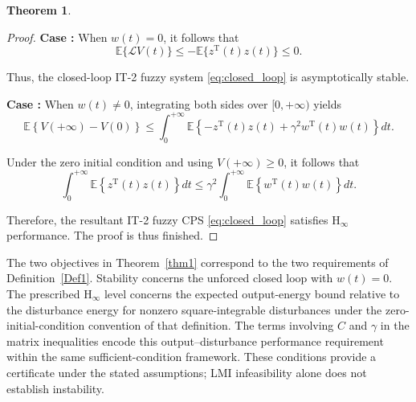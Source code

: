 \documentclass[preprint,review,fleqn,sort&compress,3p]{elsarticle}
\theoremstyle{definition} %
\theoremstyle{definition}%
\newtheorem{thm}{Theorem}[section]
\begin{document}
\begin{thm}
\begin{proof}
\textbf{Case \uppercase\expandafter{}:} When $w(t)=0$, it follows that
\begin{equation}
	\mathbb{E}\{\mathcal{L}V(t)\}
	\leq
	-\mathbb{E}\{z^{\mathrm{T}}(t)z(t)\}
	\leq 0.
\end{equation}

Thus, the closed-loop IT-2 fuzzy system \eqref{eq:closed_loop} is asymptotically stable.

\textbf{Case \uppercase\expandafter{}:} When $w(t)\neq0$, integrating both sides over $[0,+\infty)$ yields
\begin{equation}
	\mathbb{E}\left\{V(+\infty)-V(0)\right\}
	\leq
	\int_{0}^{+\infty}
	\mathbb{E}\left\{
	-z^{\mathrm{T}}(t)z(t)
	+\gamma^2 w^{\mathrm{T}}(t)w(t)
	\right\}dt.
\end{equation}

Under the zero initial condition and using $V(+\infty)\ge0$, it follows that
\begin{equation}
	\int_{0}^{+\infty}
	\mathbb{E}\left\{
	z^{\mathrm{T}}(t)z(t)
	\right\}dt
	\leq
	\gamma^2
	\int_{0}^{+\infty}
	\mathbb{E}\left\{
	w^{\mathrm{T}}(t)w(t)
	\right\}dt.
\end{equation}

Therefore, the resultant IT-2 fuzzy CPS \eqref{eq:closed_loop} satisfies $\mathrm{H}_\infty$ performance. The proof is thus finished.
\end{proof}
\end{thm}
The two objectives in Theorem~\ref{thm1} correspond to the two requirements of Definition~\ref{Def1}. Stability concerns the unforced closed loop with $w(t)=0$. The prescribed $\mathrm H_\infty$ level concerns the expected output-energy bound relative to the disturbance energy for nonzero square-integrable disturbances under the zero-initial-condition convention of that definition. The terms involving $C$ and $\gamma$ in the matrix inequalities encode this output--disturbance performance requirement within the same sufficient-condition framework. These conditions provide a certificate under the stated assumptions; LMI infeasibility alone does not establish instability.
\end{document}
